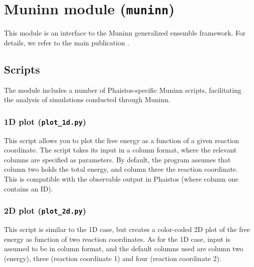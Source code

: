 \chapter{Muninn module (\texttt{muninn})}
\label{cha:muninn-module}

This module is an interface to the Muninn generalized ensemble
framework. For details, we refer to the main publication \cite{frellsen12}.

\section{Scripts}
\label{sec:muninn-scripts}

The module includes a number of Phaistos-specific Muninn scripts,
facilitating the analysis of simulations conducted through Muninn.

\subsection{1D plot (\texttt{plot\_1d.py})}
\label{sec:1d-plot}

This script allows you to plot the free energy as a function of a
given reaction coordinate. The script takes its input in a column
format, where the relevant columns are specified as parameters. By
default, the program assumes that column two holds the total energy,
and column three the reaction coordinate. This is compatible with the
observable output in Phaistos (where column one contains an ID).

\begin{optiontable}
\end{optiontable}


\subsection{2D plot (\texttt{plot\_2d.py})}
\label{sec:2d-plot}

This script is similar to the 1D case, but creates a color-coded 2D
plot of the free energy as function of two reaction coordinates. As
for the 1D case, input is assumed to be in column format, and the
default columns used are column two (energy), three (reaction
coordinate 1) and four (reaction coordinate 2).

